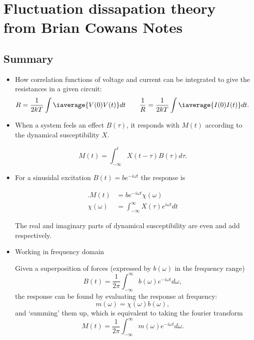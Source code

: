 \section{Fluctuation dissapation theory from Brian Cowans Notes}
\label{sec:fluctuationDissapation}

\subsection{Summary}
\begin{itemize}
\item  How  correlation  functions  of   voltage  and  current  can  be
  integrated to give the resistances in a given circuit:
  \[
    {R}                                                               =
    \frac{1}{2kT}\int\iaverage{V(0)V(t)}dt\qquad\frac{1}{R}=\frac{1}{2kT}\int\iaverage{I(0)I(t)}dt.
  \]
\item  When  a system  feels  an  effect $  B(\tau)  $,  it responds  with
  $ M(t) $ according to the dynamical susceptibility $ X $.

  \begin{framed}\noindent
    \begin{equation}
      M(t) = \int_{-\infty}^{t}X(t - \tau)B(\tau)d\tau.
    \end{equation}
  \end{framed}
\item  For a  sinusidal  excitation  $ B(t)  =  be^{-i\omega  t} $  the
  response is
  \begin{framed}\noindent
    \begin{equation}
      \begin{aligned}.M(t)    &=    be^{-i\omega   t}\chi(\omega)\\    \chi(\omega)    &=
        \int_{-\infty}^{\infty}X(\tau)e^{i\omega t}dt
      \end{aligned}
    \end{equation}
  \end{framed}

  The real and imaginary parts of dynamical susceptibility are even and
  add respectively.

\item Working in frequency domain
  \begin{framed}\noindent
    Given  a superposition  of forces  (expressed by  $ b(\omega)  $ in  the
    frequency range)
    \begin{equation}
      B(t)     =    \frac{1}{2\pi}\int_{-\infty}^{\infty}b(\omega)e^{-i\omega
        t}d\omega,
    \end{equation}
    \noindent the response  can be found by evaluating  the response at
    frequency:
    \begin{equation}
      m(\omega) = \chi(\omega)b(\omega),
    \end{equation}
    \noindent and `summing' them up,  which is equivalent to taking the
    fourier transform
    \begin{equation}
      M(t)     =    \frac{1}{2\pi}\int_{-\infty}^{\infty}m(\omega)e^{-i\omega
        t}d\omega.
    \end{equation}
  \end{framed}
\end{itemize}


